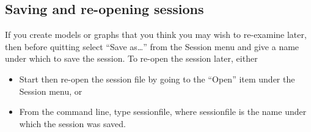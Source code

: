 \subsection{Saving and re-opening
	sessions}
\label{session-save}

If you create models or graphs that you think you may wish
	to re-examine later, then before quitting
	 select ``Save
	  as\dots{}'' from the Session menu and give a name
	under which to save the session.  To re-open the session
	later, either
\begin{itemize}
\item Start  then re-open
	    the session file by going to the ``Open'' item
	    under the Session menu, or
\item From the command line, type  sessionfile,
	    where sessionfile is the name
	    under which the session was saved.
\end{itemize}




